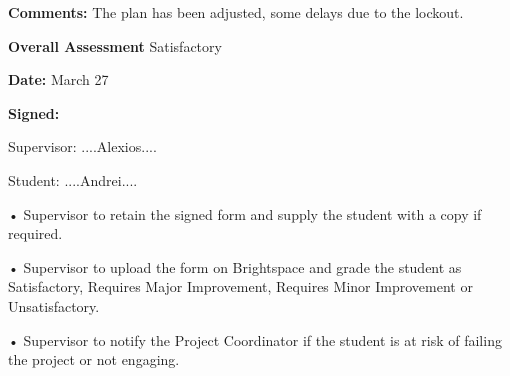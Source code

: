 \textbf{Comments:} The plan has been adjusted, some delays due to the lockout.

    \textbf{Overall Assessment} Satisfactory

\clearpage
\begin{mdframed}

    \textbf{Date:} March 27

    {\parindent0pt \textbf{Signed:} }

    Supervisor: ....Alexios....

    Student: ....Andrei....

\end{mdframed}


• Supervisor to retain the signed form and supply the student with a copy if required.

• Supervisor to upload the form on Brightspace and grade the student as Satisfactory, Requires Major Improvement, Requires Minor Improvement or Unsatisfactory.

• Supervisor to notify the Project Coordinator if the student is at risk of failing the project or not engaging.